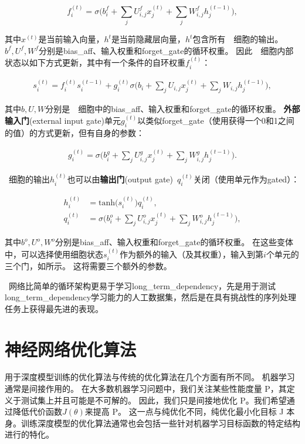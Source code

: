 \begin{equation}
f_i^{(t)} = \sigma \Big( b_i^f + \sum_j U_{i,j}^f x_j^{(t)} + \sum_j W_{i,j}^f h_j^{(t-1)} \Big),
\end{equation}

其中$x^{(t)}$是当前输入向量，$h^{t}$是当前隐藏层向量，$h^{t}$包含所有~~细胞的输出。 
$b^f, U^f, W^f$分别是\gls{bias_aff}、输入权重和\gls{forget_gate}的循环权重。
因此~~细胞内部状态以如下方式更新，其中有一个条件的自环权重$f_i^{(t)}$：

\begin{align}
s_i^{(t)} = f_i^{(t)}  s_i^{(t-1)} +  g_i^{(t)}
\sigma \Big( b_i + \sum_j U_{i,j} x_j^{(t)} + \sum_j W_{i,j} h_j^{(t-1)} \Big),
\end{align}

其中$b, U, W$分别是~~细胞中的\gls{bias_aff}、输入权重和\gls{forget_gate}的循环权重。
\textbf{外部输入门}(external input gate)单元$g_i^{(t)}$以类似\gls{forget_gate}（使用获得一个0和1之间的值）的方式更新，但有自身的参数：

\begin{align}
g_i^{(t)} = \sigma \Big( b_i^g + \sum_j U_{i,j}^g x_j^{(t)} + \sum_j W_{i,j}^g h_j^{(t-1)} \Big).
\end{align}

~细胞的输出$h_i^{(t)}$也可以由\textbf{输出门}(output gate)~$q_i^{(t)}$关闭（使用单元作为\gls{gated}）：

\begin{align}
h_i^{(t)} &= \text{tanh}\big( s_i^{(t)} \big) q_i^{(t)}, \\
q_i^{(t)} &= \sigma \Big( b_i^o + \sum_j U_{i,j}^o x_j^{(t)} + \sum_j W_{i,j}^o h_j^{(t-1)} \Big),
\end{align}

其中$b^o, U^o, W^o$分别是\gls{bias_aff}、输入权重和\gls{forget_gate}的循环权重。
在这些变体中，可以选择使用细胞状态$s_i^{(t)}$作为额外的输入（及其权重），输入到第$i$个单元的三个门，如所示。
这将需要三个额外的参数。

~网络比简单的循环架构更易于学习\gls{long_term_dependency}，先是用于测试\gls{long_term_dependency}学习能力的人工数据集\citep{Bengio-trnn94,Hochreiter+Schmidhuber-1997,chapter-gradient-flow-2001}，然后是在具有挑战性的序列处理任务上获得最先进的表现\citep{Graves-book2012,Graves-arxiv2013,Sutskever-et-al-NIPS2014}。

\section{神经网络优化算法}
用于深度模型训练的优化算法与传统的优化算法在几个方面有所不同。 机器学习通常是间接作用的。
在大多数机器学习问题中，我们关注某些性能度量 P，其定义于测试集上并且可能是不可解的。
因此，我们只是间接地优化 P。我们希望通过降低代价函数$J(θ)$来提高 P。
这一点与纯优化不同，纯优化最小化目标 J 本身。训练深度模型的优化算法通常也会包括一些针对机器学习目标函数的特定结构进行的特化。

